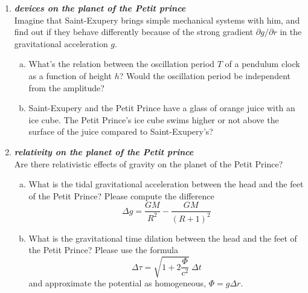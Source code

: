 \documentclass[a4paper,12pt]{article}
\newcommand{\question}[1]{\textbf{\textit{#1}}}
\begin{document}
\begin{enumerate}
\item \question{devices on the planet of the Petit prince}\\
Imagine that Saint-Exupery brings simple mechanical systems with him, and find out if they behave differently because of the strong gradient $\partial g/\partial r$ in the gravitational acceleration $g$.
\begin{enumerate}[(a)]
\item{What's the relation between the oscillation period $T$ of a pendulum clock as a function of height $h$? Would the oscillation period be independent from the amplitude?}
\item{Saint-Exupery and the Petit Prince have a glass of orange juice
    with an ice cube. The Petit Prince's ice cube swims higher or not above the surface of the juice compared to Saint-Exupery's?}
\end{enumerate}

\item \question{relativity on the planet of the Petit prince}\\
Are there relativistic effects of gravity on the planet of the Petit Prince?
\begin{enumerate}[(a)]
\item{What is the tidal gravitational acceleration between the head
    and the feet of the Petit Prince? Please compute the difference
\begin{equation}
\Delta g = \frac{GM}{R^2}-\frac{GM}{(R+1)^2} 
\end{equation}
}
\item{What is the gravitational time dilation between the head and the feet of the Petit Prince? Please use the formula
\begin{equation}
\Delta \tau = \sqrt{1+2\frac{\Phi}{c^2}}\:\Delta t
\end{equation}
and approximate the potential as homogeneous, $\Phi = g\Delta r$.
}
\end{enumerate}
\end{enumerate}
\end{document}
